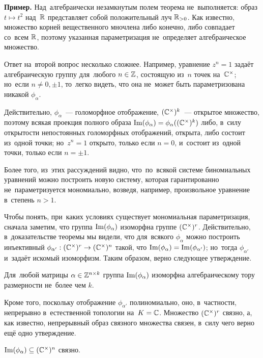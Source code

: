 \documentclass{article}
\begin{document}
\noindent\textbf{Пример.} Над~алгебраически незамкнутым полем теорема не~выполняется: образ $t \mapsto t^2$ над~$\mathbb{R}$
представляет собой положительный луч $\mathbb{R}_{>0}$. Как известно, множество корней вещественного мночлена либо конечно,
либо совпадает со~всем $\mathbb{R}$, поэтому указанная параметризация не~определяет алгебраическое множество.
\medskip

Ответ на~второй вопрос несколько сложнее. Например, уравнение $z^n = 1$ задаёт алгебраическую
группу для~любого $n \in \mathbb{Z}$, состоящую из~$n$ точек на~$\mathbb{C}^\times$; но~если $n \neq 0, \pm 1$,
то~легко видеть, что она не~может быть параметризована никакой $\phi_\alpha$.

Действительно, $\phi_\alpha$~— голоморфное отображение, $(\mathbb{C}^\times)^k$~— открытое множество,
поэтому всякая проекция полного образа $\mathrm{Im}(\phi_\alpha) = \phi_\alpha((\mathbb{C}^\times)^k)$ либо, в~силу
открытости непостоянных голоморфных отображений, открыта, либо состоит из~одной точки; но~$z^n = 1$
открыто, только если $n = 0$, и~состоит из~одной точки, только если $n = \pm 1$.

Более того, из~этих рассуждений видно, что~по~всякой системе биномиальных уравнений можно построить новую систему,
которая гарантированно не~параметризуется мономиально, возведя, например, произвольное уравнение в~степень $n > 1$.

Чтобы понять, при~каких условиях существует мономиальная параметризация, сначала заметим, что группа $\mathrm{Im}(\phi_\alpha)$
изоморфна группе $(\mathbb{C}^\times)^r$. Действительно, в~доказательстве теоремы мы видели, что для~всякого $\phi_\alpha$
можно построить инъективный $\phi_{\alpha'} : (\mathbb{C}^\times)^r \rightarrow (\mathbb{C}^\times)^n$ такой, что $\mathrm{Im}(\phi_\alpha) = \mathrm{Im}(\phi_{\alpha'})$;
но~тогда $\phi_{\alpha'}$ и~задаёт искомый изоморфизм. Таким образом, верно следующее утверждение.

\begin{statement*}
    Для~любой матрицы $\alpha \in \mathbb{Z}^{n \times k}$ группа $\mathrm{Im}(\phi_\alpha)$ изоморфна алгебраическому тору размерности не~более чем $k$.
\end{statement*}

Кроме того, поскольку отображение $\phi_{\alpha'}$ полиномиально, оно, в~частности, непрерывно в~естественной топологии на~$K = \mathbb{C}$.
Множество $(\mathbb{C}^\times)^r$ связно, а, как известно, непрерывный образ связного множества связен, в~силу чего верно ещё одно утверждение.

\begin{statement*}
    $\mathrm{Im}(\phi_\alpha) \subseteq (\mathbb{C}^\times)^n$ связно.
\end{statement*}
\end{document}
